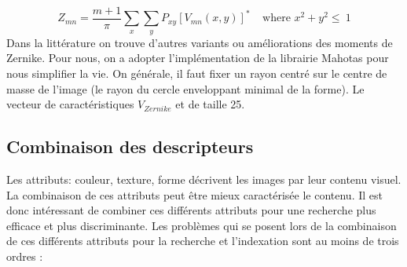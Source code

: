 \begin{displaymath}
Z_{mn} = \frac{m+1}{\pi} \sum_{x} \sum_{y} P_{xy}[V_{mn}(x,y)]^{*} ~~~~~\mbox{where $x^{2} + y^{2} \leq ~1$}
\end{displaymath}
Dans la littérature on trouve d'autres variants ou améliorations des moments de Zernike. Pour nous, on a adopter l'implémentation de la librairie Mahotas pour nous simplifier la vie. On générale, il faut fixer un rayon centré sur le centre de masse de l'image (le rayon du cercle enveloppant minimal de la forme).
Le vecteur de caractéristiques $ V_{Zernike} $ et de taille 25.

\subsection{Combinaison des descripteurs}
Les attributs: couleur, texture, forme décrivent les images par leur contenu visuel. La
combinaison de ces attributs peut être mieux caractérisée le contenu. Il est donc intéressant de
combiner ces différents attributs pour une recherche plus efficace et plus discriminante. Les
problèmes qui se posent lors de la combinaison de ces différents attributs pour la recherche et
l’indexation sont au moins de trois ordres :

